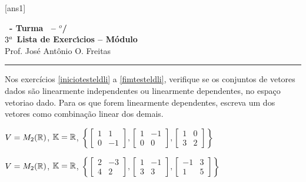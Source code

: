 \documentclass[12pt]{exam}
\begin{document}
    [ans1]
    
    \begin{center}
        {\Large\bf \disciplina\ - Turma \turma\ -- \semestre$^{o}$/\ano} \\ \vspace{9pt} {\large\bf
            $3^a$ Lista de Exerc{\'\i}cios -- Módulo \numeromodulo}\\ \vspace{9pt} Prof. Jos{\'e} Ant{\^o}nio O. Freitas
    \end{center}
    
    \hrule

    Nos exercícios \ref{iniciotesteldli} a \ref{fimtesteldli}, verifique se os conjuntos de vetores dados são 
    linearmente independentes ou linearmente dependentes, 
    no espaço vetoriao dado. Para os que forem linearmente dependentes,
    escreva um dos vetores como combinação linear dos demais.

    \begin{exercicio}\label{iniciotesteldli}
        $V = M_2(\mathbb{R})$, $\mathbb{K} = \mathbb{R}$,
        $
            \left\{
                \begin{bmatrix}
                    1 & 1\\
                    0 & -1
                \end{bmatrix},
                \begin{bmatrix}
                    1 & -1\\
                    0 & 0
                \end{bmatrix},
                \begin{bmatrix}
                    1 & 0\\
                    3 & 2
                \end{bmatrix}
            \right\}
        $
    \end{exercicio}

    \begin{exercicio}
        $V = M_2(\mathbb{R})$, $\mathbb{K} = \mathbb{R}$,
        $
            \left\{
                \begin{bmatrix}
                    2 & -3\\
                    4 & 2
                \end{bmatrix},
                \begin{bmatrix}
                    1 & -1\\
                    3 & 3
                \end{bmatrix},
                \begin{bmatrix}
                    -1 & 3\\
                    1 & 5
                \end{bmatrix}
            \right\}
        $
    \end{exercicio}
    
\end{document}
